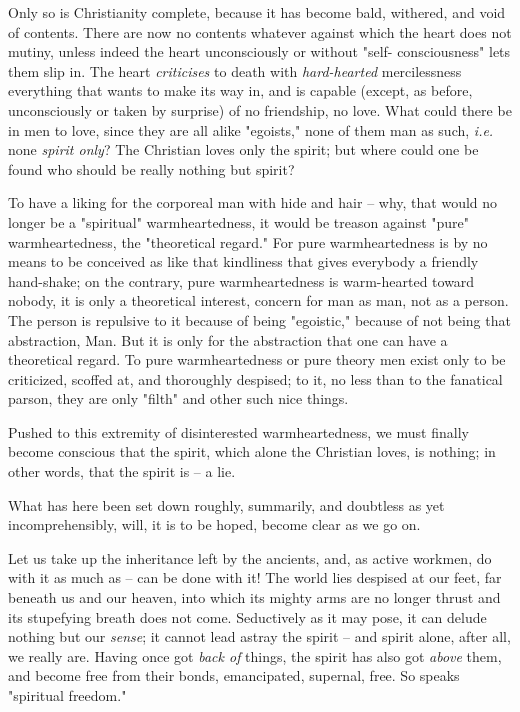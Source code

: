 Only so is Christianity complete, because it has become bald, withered, and 
void of contents. There are now no contents whatever against which the heart 
does not mutiny, unless indeed the heart unconsciously or without "{}self- 
consciousness"{} lets them slip in. The heart \textit{criticises} to death 
with \textit{hard-hearted} mercilessness everything that wants to make its way 
in, and is capable (except, as before, unconsciously or taken by surprise) of 
no friendship, no love. What could there be in men to love, since they are all 
alike "{}egoists,"{} none of them man as such, \textit{i.e.} none 
\textit{spirit only}? The Christian loves only the spirit; but where could one 
be found who should be really nothing but spirit?

To have a liking for the corporeal man with hide and hair -- why, that would 
no longer be a "{}spiritual"{} warmheartedness, it would be treason against 
"{}pure"{} warmheartedness, the "{}theoretical regard."{} For pure 
warmheartedness is by no means to be conceived as like that kindliness that 
gives everybody a friendly hand-shake; on the contrary, pure warmheartedness 
is warm-hearted toward nobody, it is only a theoretical interest, concern for 
man as man, not as a person. The person is repulsive to it because of being 
"{}egoistic,"{} because of not being that abstraction, Man. But it is only for 
the abstraction that one can have a theoretical regard. To pure 
warmheartedness or pure theory men exist only to be criticized, scoffed at, 
and thoroughly despised; to it, no less than to the fanatical parson, they are 
only "{}filth"{} and other such nice things.

Pushed to this extremity of disinterested warmheartedness, we must finally 
become conscious that the spirit, which alone the Christian loves, is nothing; 
in other words, that the spirit is -- a lie.

What has here been set down roughly, summarily, and doubtless as yet 
incomprehensibly, will, it is to be hoped, become clear as we go on.

Let us take up the inheritance left by the ancients, and, as active workmen, 
do with it as much as -- can be done with it! The world lies despised at our 
feet, far beneath us and our heaven, into which its mighty arms are no longer 
thrust and its stupefying breath does not come. Seductively as it may pose, it 
can delude nothing but our \textit{sense}; it cannot lead astray the spirit -- 
and spirit alone, after all, we really are. Having once got \textit{back of} 
things, the spirit has also got \textit{above} them, and become free from 
their bonds, emancipated, supernal, free. So speaks "{}spiritual freedom."{}

